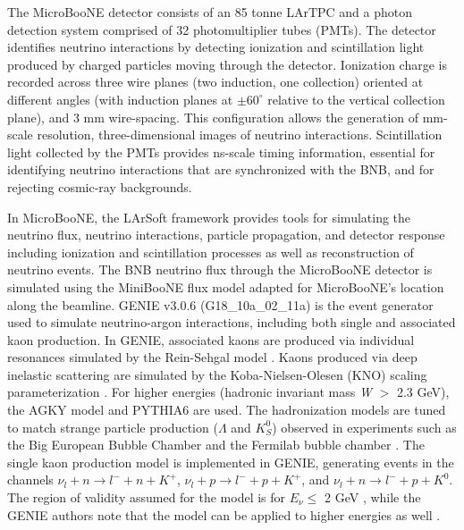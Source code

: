 \documentclass[aps,prd,longbibliography,twocolumn,showpacs,superscriptaddress,floatfix,10pt]{revtex4-1}
\begin{document}
The MicroBooNE detector \cite{Fleming:2012gvl, MicroBooNE:2016pwy} consists of an 85 tonne LArTPC and a photon detection system comprised of 32 photomultiplier tubes (PMTs). The detector identifies neutrino interactions by detecting ionization and scintillation light produced by charged particles moving through the detector. Ionization charge is recorded across three wire planes (two induction, one collection) oriented at different angles (with induction planes at  $\pm60^\circ$ relative to the vertical collection plane), and 3 mm wire-spacing. This configuration allows the generation of mm-scale resolution, three-dimensional images of neutrino interactions. Scintillation light collected by the PMTs provides ns-scale timing information, essential for identifying neutrino interactions that are synchronized with the BNB, and for rejecting cosmic-ray backgrounds.

In MicroBooNE, the LArSoft framework \cite{Snider:2017wjd} provides tools for simulating the neutrino flux, neutrino interactions, particle propagation, and detector response including ionization and scintillation processes as well as reconstruction of neutrino events. The BNB neutrino flux through the MicroBooNE detector is simulated using the MiniBooNE flux model \cite{PhysRevD.79.072002} adapted for MicroBooNE's location along the beamline. GENIE v3.0.6 (G18\_10a\_02\_11a)  \cite{Andreopoulos:2009rq, PhysRevD.104.072009} is the event generator used to simulate neutrino-argon interactions, including both single and associated kaon production. In GENIE, associated kaons are produced via individual resonances simulated by the Rein-Sehgal model \cite{REIN198179}. Kaons produced via deep inelastic scattering are simulated by the Koba-Nielsen-Olesen (KNO) scaling parameterization \cite{KOBA1972317}. For higher energies (hadronic invariant mass \textit{W} $>$ 2.3 GeV), the AGKY model \cite{Yang_2009} and PYTHIA6 \cite{Sj_strand_2006} are used. The hadronization models are tuned to match strange particle production ($\Lambda$ and $K^{0}_S$) observed in experiments such as the Big European Bubble Chamber 
\cite{Jones:1992bm, ALLASIA19831, WA59:1991cop, BOSETTI198229} and the Fermilab bubble chamber \cite{PhysRevD.34.1251, PhysRevD.50.6691}. The single kaon production model \cite{skmodel} is implemented in GENIE, generating events in the channels $\nu_{l} + n \rightarrow l^- + n + K^+$, $\nu_{l} + p \rightarrow l^- + p + K^+$, and $\nu_{l} + n \rightarrow l^- + p + K^0$. The region of validity assumed for the model is for $E_{\nu} \leq$ 2 GeV \cite{skmodel, skmodel2}, while the GENIE authors note that the model can be applied to higher energies as well \cite{geniesingle}. 
\end{document}
